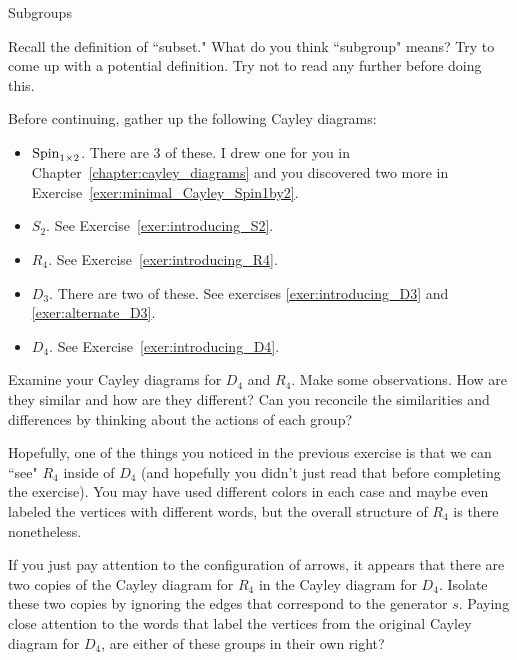 \begin{section}{Subgroups}

\begin{exercise}
Recall the definition of ``subset."  What do you think ``subgroup" means?  Try to come up with a potential definition.  Try not to read any further before doing this.
\end{exercise}

Before continuing, gather up the following Cayley diagrams:
\begin{itemize}
\item $\operatorname{Spin}_{1\times 2}$. There are 3 of these.  I drew one for you in Chapter~\ref{chapter:cayley_diagrams} and you discovered two more in Exercise~\ref{exer:minimal_Cayley_Spin1by2}.
\item $S_2$.  See Exercise~\ref{exer:introducing_S2}.
\item $R_4$.  See Exercise~\ref{exer:introducing_R4}.
\item $D_3$.  There are two of these.  See exercises \ref{exer:introducing_D3} and \ref{exer:alternate_D3}.
\item $D_4$.  See Exercise~\ref{exer:introducing_D4}.
\end{itemize}

\begin{exercise}\label{exer:R4_in_D4}
Examine your Cayley diagrams for $D_4$ and $R_4$.  Make some observations.  How are they similar and how are they different?  Can you reconcile the similarities and differences by thinking about the actions of each group?
\end{exercise}

Hopefully, one of the things you noticed in the previous exercise is that we can ``see" $R_4$ inside of $D_4$ (and hopefully you didn't just read that before completing the exercise).  You may have used different colors in each case and maybe even labeled the vertices with different words, but the overall structure of $R_4$ is there nonetheless.

\begin{exercise}\label{exer:R4_subgroup_D_4}
If you just pay attention to the configuration of arrows, it appears that there are two copies of the Cayley diagram for $R_4$ in the Cayley diagram for $D_4$.  Isolate these two copies by ignoring the edges that correspond to the generator $s$.  Paying close attention to the words that label the vertices from the original Cayley diagram for $D_4$, are either of these groups in their own right?
\end{exercise}


\end{section}
